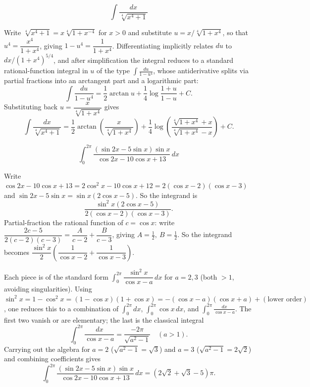 \begin{questions}
 
\question
\[
\int \frac{dx}{\sqrt[4]{x^4+1}}
\]
\begin{solution}
Write $\sqrt[4]{x^4+1}=x\sqrt[4]{1+x^{-4}}$ for $x>0$ and substitute $u=x/\sqrt[4]{1+x^4}$, so that $u^4=\dfrac{x^4}{1+x^4}$, giving $1-u^4=\dfrac{1}{1+x^4}$. Differentiating implicitly relates $du$ to $dx/(1+x^4)^{5/4}$, and after simplification the integral reduces to a standard rational-function integral in $u$ of the type $\int\frac{du}{1-u^4}$, whose antiderivative splits via partial fractions into an arctangent part and a logarithmic part:
\[
\int\frac{du}{1-u^4}=\frac12\arctan u+\frac14\log\frac{1+u}{1-u}+C.
\]
Substituting back $u=\dfrac{x}{\sqrt[4]{1+x^4}}$ gives
\[
\int \frac{dx}{\sqrt[4]{x^4+1}}=\frac12\arctan\!\left(\frac{x}{\sqrt[4]{1+x^4}}\right)+\frac14\log\!\left(\frac{\sqrt[4]{1+x^4}+x}{\sqrt[4]{1+x^4}-x}\right)+C.
\]
\end{solution}
 
\question
\[
\int_0^{2\pi} \frac{(\sin 2x-5\sin x)\sin x}{\cos 2x-10\cos x+13}\,dx
\]
\begin{solution}
Write $\cos2x-10\cos x+13=2\cos^2x-10\cos x+12=2(\cos x-2)(\cos x-3)$ and $\sin2x-5\sin x=\sin x(2\cos x-5)$. So the integrand is
\[
\frac{\sin^2x(2\cos x-5)}{2(\cos x-2)(\cos x-3)}.
\]
Partial-fraction the rational function of $c=\cos x$: write $\dfrac{2c-5}{2(c-2)(c-3)}=\dfrac{A}{c-2}+\dfrac{B}{c-3}$, giving $A=\tfrac12,\ B=\tfrac12$. So the integrand becomes $\dfrac{\sin^2x}{2}\left(\dfrac{1}{\cos x-2}+\dfrac{1}{\cos x-3}\right)$.
 
Each piece is of the standard form $\int_0^{2\pi}\dfrac{\sin^2x}{\cos x-a}\,dx$ for $a=2,3$ (both $>1$, avoiding singularities). Using $\sin^2x=1-\cos^2x=(1-\cos x)(1+\cos x)=-(\cos x-a)(\cos x+a)+ (\text{lower order})$, one reduces this to a combination of $\int_0^{2\pi}d x$, $\int_0^{2\pi}\cos x\,dx$, and $\int_0^{2\pi}\frac{dx}{\cos x-a}$. The first two vanish or are elementary; the last is the classical integral
\[
\int_0^{2\pi}\frac{dx}{\cos x - a}=\frac{-2\pi}{\sqrt{a^2-1}}\quad (a>1).
\]
Carrying out the algebra for $a=2$ ($\sqrt{a^2-1}=\sqrt3$) and $a=3$ ($\sqrt{a^2-1}=2\sqrt2$) and combining coefficients gives
\[
\int_0^{2\pi} \frac{(\sin 2x-5\sin x)\sin x}{\cos 2x-10\cos x+13}\,dx=(2\sqrt2+\sqrt3-5)\pi.
\]
\end{solution}
 

\end{questions}
